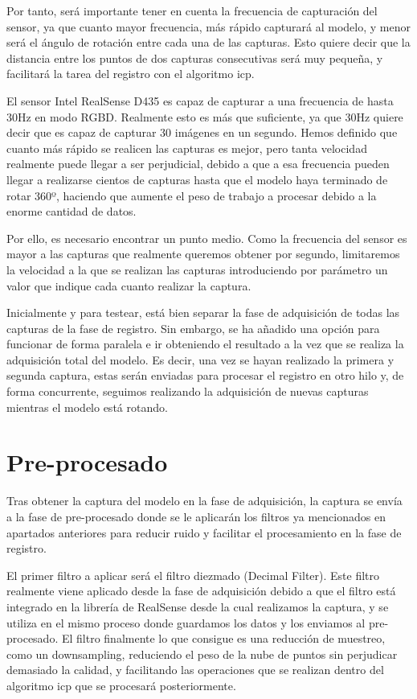 Por tanto, será importante tener en cuenta la frecuencia de capturación del sensor, ya que cuanto mayor frecuencia, más rápido capturará al modelo, y menor será el ángulo de rotación entre cada una de las capturas.
Esto quiere decir que la distancia entre los puntos de dos capturas consecutivas será muy pequeña, y facilitará la tarea del registro con el algoritmo \gls{icp}.

El sensor Intel RealSense D435 es capaz de capturar a una frecuencia de hasta 30Hz en modo RGBD.
Realmente esto es más que suficiente, ya que 30Hz quiere decir que es capaz de capturar 30 imágenes en un segundo.
Hemos definido que cuanto más rápido se realicen las capturas es mejor, pero tanta velocidad realmente puede llegar a ser perjudicial, debido a que a esa frecuencia pueden llegar a realizarse cientos de capturas hasta que el modelo haya terminado de rotar 360º, haciendo que aumente el peso de trabajo a procesar debido a la enorme cantidad de datos.

Por ello, es necesario encontrar un punto medio. Como la frecuencia del sensor es mayor a las capturas que realmente queremos obtener por segundo, limitaremos la velocidad a la que se realizan las capturas introduciendo por parámetro un valor que indique cada cuanto realizar la captura.

Inicialmente y para testear, está bien separar la fase de adquisición de todas las capturas de la fase de registro. Sin embargo, se ha añadido una opción para funcionar de forma paralela e ir obteniendo el resultado a la vez que se realiza la adquisición total del modelo.
Es decir, una vez se hayan realizado la primera y segunda captura, estas serán enviadas para procesar el registro en otro hilo y, de forma concurrente, seguimos realizando la adquisición de nuevas capturas mientras el modelo está rotando.

\section{Pre-procesado}

Tras obtener la captura del modelo en la fase de adquisición, la captura se envía a la fase de pre-procesado donde se le aplicarán los filtros ya mencionados en apartados anteriores para reducir ruido y facilitar el procesamiento en la fase de registro.

El primer filtro a aplicar será el filtro diezmado (Decimal Filter). Este filtro realmente viene aplicado desde la fase de adquisición debido a que el filtro está integrado en la librería de RealSense desde la cual realizamos la captura, y se utiliza en el mismo proceso donde guardamos los datos y los enviamos al pre-procesado.
El filtro finalmente lo que consigue es una reducción de muestreo, como un downsampling, reduciendo el peso de la nube de puntos sin perjudicar demasiado la calidad, y facilitando las operaciones que se realizan dentro del algoritmo \gls{icp} que se procesará posteriormente.

